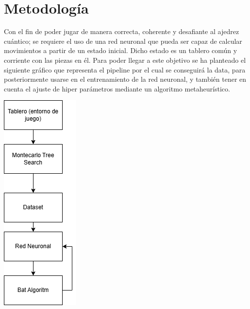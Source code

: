 
\section{Metodología}

Con el fin de poder jugar de manera correcta, coherente y desafiante al ajedrez cuántico; se requiere el uso de una red neuronal que pueda ser capaz de calcular movimientos a partir de un estado inicial. Dicho estado es un tablero común y corriente con las piezas en él. Para poder llegar a este objetivo se ha planteado el siguiente gráfico que representa el pipeline por el cual se conseguirá la data, para posteriormente usarse en el entrenamiento de la red neuronal, y también tener en cuenta el ajuste de hiper parámetros mediante un algoritmo metaheurístico.

\begin{center}
	\includegraphics[scale=0.5] {Imagenes/Trabajo_RED_NEURONAL.drawio.png}
\end{center}

